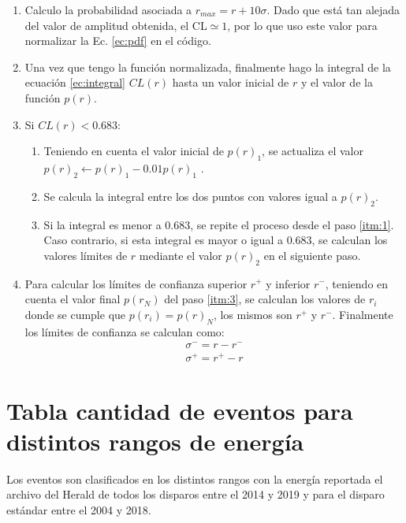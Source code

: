 \documentclass[11pt,papel,oneside,singlespace]{ibtesis}
\begin{document}
\begin{enumerate}
    \item Calculo la probabilidad asociada a $r_{max}=r +  10\sigma$. Dado que está tan alejada del valor de amplitud obtenida, el CL$\simeq 1$, por lo que uso este valor para normalizar  la Ec. \ref{ec:pdf} en el código.
    \item Una vez que tengo la función normalizada, finalmente hago la integral de la ecuación \ref{ec:integral} $CL(r)$ hasta un valor inicial de $r$ y el valor de la función $p(r)$.
    \item Si $CL(r)< 0.683$:
    \begin{enumerate}
        \item Teniendo en cuenta el valor inicial de $p(r)_1$, se actualiza el valor  $p(r)_2 \leftarrow p(r)_1 - 0.01 p(r)_1$ \label{itm:1}.
        \item Se calcula la integral entre los dos puntos con valores igual a $p(r)_2$. 
        \item Si la integral es menor a $0.683$, se repite el proceso desde el paso \ref{itm:1}. Caso contrario, si esta integral es mayor o igual a $0.683$, se calculan los valores límites de $r$ mediante el valor $p(r)_2$ en el siguiente paso. \label{itm:3}
    \end{enumerate}
    \item Para calcular los límites de confianza superior $r^+$  y inferior $r^-$, teniendo en cuenta el valor final $p(r_N)$ del paso \ref{itm:3}, se calculan los valores de $r_i$ donde se cumple que $p(r_i)=p(r)_N$, los mismos son $r^+$  y  $r^-$. Finalmente los límites de confianza se calculan como:
    \begin{align*}
        \sigma^- = r-r^-\\
        \sigma^+ = r^+ -r
    \end{align*}
\end{enumerate}



\section{Tabla cantidad de eventos para distintos rangos de energía}

Los eventos son clasificados en los distintos rangos con la energía reportada el archivo del Herald de todos los disparos  entre el 2014 y 2019 y para el disparo estándar entre el 2004 y 2018.
\end{document}
